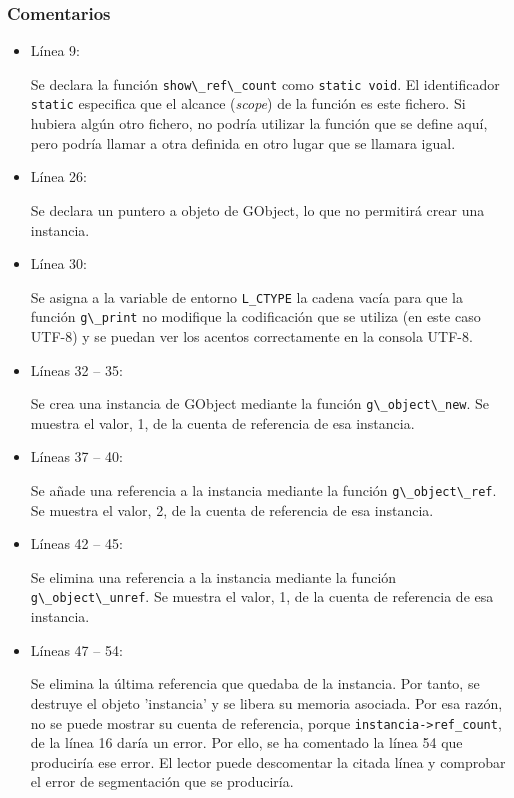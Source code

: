 \subsubsection{Comentarios}
\begin{itemize}
\item Línea 9:\par
  Se declara la función \passthrough{\lstinline!show\_ref\_count!} como \texttt{static
    void}.
  El identificador \texttt{static} especifica que el alcance (\textit{scope}) de la
  función es
  este fichero. Si hubiera algún otro fichero, no podría utilizar la función que se
  define aquí, pero podría llamar a otra definida en otro lugar que se llamara igual.
\item Línea 26:\par
  Se declara un puntero a objeto de \textsf{GObject}, lo que no permitirá crear una
  instancia.
\item Línea 30:\par
  Se asigna a la variable de entorno \texttt{L\_CTYPE} la cadena vacía para que la
  función
  \passthrough{\lstinline!g\_print!} no modifique la codificación que se utiliza (en
  este caso UTF-8)
  y se puedan ver los acentos correctamente en la consola UTF-8.
\item Líneas 32 -- 35:\par
  Se crea una instancia de \textsf{GObject} mediante la función \passthrough{\lstinline!g\_object\_new!}.
  Se muestra el valor, 1,  de la cuenta de referencia de esa instancia.
\item Líneas 37 -- 40:\par
  Se añade una referencia a la instancia mediante la función  \passthrough{\lstinline!g\_object\_ref!}.
  Se muestra el valor, 2,  de la cuenta de referencia de esa instancia.
\item Líneas 42 -- 45:\par
  Se elimina una referencia a la instancia mediante la función  \passthrough{\lstinline!g\_object\_unref!}.
  Se muestra el valor, 1,  de la cuenta de referencia de esa instancia.
\item Líneas 47 -- 54:\par
  Se elimina la  última referencia que quedaba de la instancia.
  Por tanto, se destruye el objeto 'instancia' y se libera su memoria asociada.
  Por esa razón, no se puede mostrar su cuenta de referencia, porque
  \passthrough{\lstinline!instancia->ref_count!}, de la línea 16 daría un error.
  Por ello, se ha comentado la línea 54 que produciría ese error.
  El lector puede descomentar la citada línea y comprobar el error de segmentación que
  se produciría.
\end{itemize}



